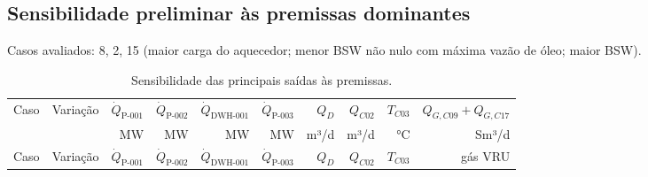 \documentclass[11pt,a4paper]{article}
\numberwithin{equation}{section}
\numberwithin{table}{section}
\numberwithin{figure}{section}
\begin{document}
\subsection{Sensibilidade preliminar às premissas dominantes}
Casos avaliados: 8, 2, 15 (maior carga do aquecedor; menor BSW não nulo com máxima vazão de óleo; maior BSW).
\begin{landscape}\small
\begin{longtable}{rL{5.0cm}rrrrrrrr}
\caption{Sensibilidade das principais saídas às premissas.}\label{tab:sens}\\\toprule
Caso & Variação & $\dot Q_{\mbox{P-001}}$ & $\dot Q_{\mbox{P-002}}$ & $\dot Q_{\mbox{DWH-001}}$ & $\dot Q_{\mbox{P-003}}$ & $Q_D$ & $Q_{C02}$ & $T_{C03}$ & $Q_{G,C09}+Q_{G,C17}$\\
 & & MW & MW & MW & MW & m³/d & m³/d & °C & Sm³/d\\\midrule\endfirsthead
\toprule Caso & Variação & $\dot Q_{\mbox{P-001}}$ & $\dot Q_{\mbox{P-002}}$ & $\dot Q_{\mbox{DWH-001}}$ & $\dot Q_{\mbox{P-003}}$ & $Q_D$ & $Q_{C02}$ & $T_{C03}$ & gás VRU\\\midrule\endhead


\end{longtable}
\end{landscape}
\end{document}
